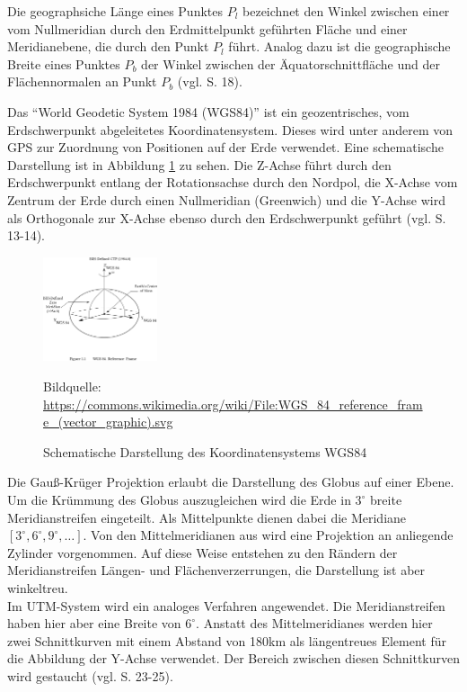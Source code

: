Die geographsiche Länge eines Punktes $P_l$ bezeichnet den Winkel zwischen einer vom Nullmeridian durch den Erdmittelpunkt geführten Fläche und einer Meridianebene, die durch den Punkt $P_l$ führt.
Analog dazu ist die geographische Breite eines Punktes $P_b$ der Winkel zwischen der Äquatorschnittfläche und der Flächennormalen an Punkt $P_b$ (vgl.  \cite{witte2011vermessungskunde} S. 18).


Das "`World Geodetic System 1984 (WGS84)"' ist ein geozentrisches, vom Erdschwerpunkt abgeleitetes Koordinatensystem. Dieses wird unter anderem von GPS zur Zuordnung von Positionen auf der Erde verwendet. Eine schematische Darstellung ist in Abbildung \ref{fig:wgs84} zu sehen. Die  Z-Achse führt durch den Erdschwerpunkt entlang der Rotationsachse durch den Nordpol, die X-Achse vom Zentrum der Erde durch einen Nullmeridian (Greenwich) und die Y-Achse wird als Orthogonale zur X-Achse ebenso durch den Erdschwerpunkt geführt (vgl. \cite{witte2011vermessungskunde} S. 13-14).


\begin{figure}[h!]
 \centering
 \includegraphics[width=0.3\textwidth, trim={0 9cm 0 3cm},clip]{pix/WGS_84_reference_frame.png}
 \caption[Schematische Darstellung des Koordinatensystems WGS84]
 {Schematische Darstellung des Koordinatensystems WGS84}
 \footnotesize{
    Bildquelle: \url{https://commons.wikimedia.org/wiki/File:WGS_84_reference_frame_(vector_graphic).svg}
 }
 \label{fig:wgs84}
\end{figure}



Die Gauß-Krüger Projektion erlaubt die Darstellung des Globus auf einer Ebene. Um die Krümmung des Globus auszugleichen wird die Erde in $3^\circ$ breite Meridianstreifen eingeteilt. Als Mittelpunkte dienen dabei die Meridiane $[ 3^\circ, 6^\circ, 9^\circ, \dots]$. Von den Mittelmeridianen aus wird eine Projektion an anliegende Zylinder vorgenommen. Auf diese Weise entstehen zu den Rändern der Meridianstreifen Längen- und Flächenverzerrungen, die Darstellung ist aber winkeltreu.
\\

Im UTM-System wird ein analoges Verfahren angewendet. Die Meridianstreifen haben hier aber eine Breite von $6^\circ$. Anstatt des Mittelmeridianes werden hier zwei Schnittkurven mit einem Abstand von 180km als längentreues Element für die Abbildung der Y-Achse verwendet. Der Bereich zwischen diesen Schnittkurven wird gestaucht (vgl. \cite{witte2011vermessungskunde} S. 23-25).


